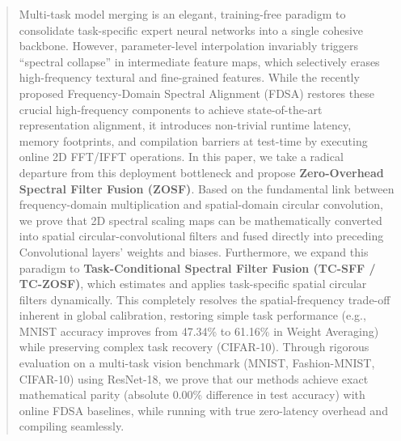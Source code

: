 \documentclass{article}
\theoremstyle{plain}
\theoremstyle{definition}
\theoremstyle{remark}
\begin{document}
\setlength{\abovedisplayskip}{2pt}
\setlength{\belowdisplayskip}{2pt}
\setlength{\abovedisplayshortskip}{1pt}
\setlength{\belowdisplayshortskip}{1pt}
\setlength{\textfloatsep}{5pt plus 2pt minus 2pt}
\setlength{\floatsep}{4pt plus 1pt minus 1pt}
\setlength{\intextsep}{4pt plus 1pt minus 1pt}
\setlength{\dbltextfloatsep}{5pt plus 2pt minus 2pt}
\setlength{\dblfloatsep}{4pt plus 1pt minus 1pt}


\printAffiliationsAndNotice{}

\begin{abstract}
Multi-task model merging is an elegant, training-free paradigm to consolidate task-specific expert neural networks into a single cohesive backbone. However, parameter-level interpolation invariably triggers ``spectral collapse'' in intermediate feature maps, which selectively erases high-frequency textural and fine-grained features. While the recently proposed Frequency-Domain Spectral Alignment (FDSA) restores these crucial high-frequency components to achieve state-of-the-art representation alignment, it introduces non-trivial runtime latency, memory footprints, and compilation barriers at test-time by executing online 2D FFT/IFFT operations. In this paper, we take a radical departure from this deployment bottleneck and propose \textbf{Zero-Overhead Spectral Filter Fusion (ZOSF)}. Based on the fundamental link between frequency-domain multiplication and spatial-domain circular convolution, we prove that 2D spectral scaling maps can be mathematically converted into spatial circular-convolutional filters and fused directly into preceding Convolutional layers' weights and biases. Furthermore, we expand this paradigm to \textbf{Task-Conditional Spectral Filter Fusion (TC-SFF / TC-ZOSF)}, which estimates and applies task-specific spatial circular filters dynamically. This completely resolves the spatial-frequency trade-off inherent in global calibration, restoring simple task performance (e.g., MNIST accuracy improves from 47.34\% to 61.16\% in Weight Averaging) while preserving complex task recovery (CIFAR-10). Through rigorous evaluation on a multi-task vision benchmark (MNIST, Fashion-MNIST, CIFAR-10) using ResNet-18, we prove that our methods achieve exact mathematical parity (absolute 0.00\% difference in test accuracy) with online FDSA baselines, while running with true zero-latency overhead and compiling seamlessly.
\end{abstract}
\end{document}
